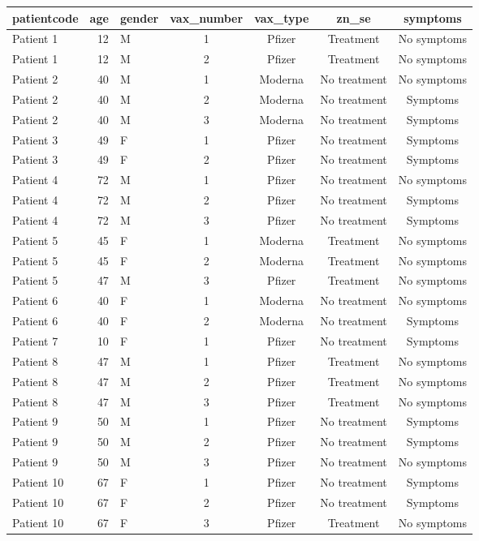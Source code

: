 \documentclass[
]{article}
\begin{document}
\captionsetup[table]{labelformat=empty,skip=1pt}
\begin{longtable}{lrlcccc}
\toprule
patientcode & age & gender & vax\_number & vax\_type & zn\_se & symptoms \\ 
\midrule
Patient 1 & 12 & M & 1 & Pfizer & Treatment & No symptoms \\ 
Patient 1 & 12 & M & 2 & Pfizer & Treatment & No symptoms \\ 
Patient 2 & 40 & M & 1 & Moderna & No treatment & No symptoms \\ 
Patient 2 & 40 & M & 2 & Moderna & No treatment & Symptoms \\ 
Patient 2 & 40 & M & 3 & Moderna & No treatment & Symptoms \\ 
Patient 3 & 49 & F & 1 & Pfizer & No treatment & Symptoms \\ 
Patient 3 & 49 & F & 2 & Pfizer & No treatment & Symptoms \\ 
Patient 4 & 72 & M & 1 & Pfizer & No treatment & No symptoms \\ 
Patient 4 & 72 & M & 2 & Pfizer & No treatment & Symptoms \\ 
Patient 4 & 72 & M & 3 & Pfizer & No treatment & Symptoms \\ 
Patient 5 & 45 & F & 1 & Moderna & Treatment & No symptoms \\ 
Patient 5 & 45 & F & 2 & Moderna & Treatment & No symptoms \\ 
Patient 5 & 47 & M & 3 & Pfizer & Treatment & No symptoms \\ 
Patient 6 & 40 & F & 1 & Moderna & No treatment & No symptoms \\ 
Patient 6 & 40 & F & 2 & Moderna & No treatment & Symptoms \\ 
Patient 7 & 10 & F & 1 & Pfizer & No treatment & Symptoms \\ 
Patient 8 & 47 & M & 1 & Pfizer & Treatment & No symptoms \\ 
Patient 8 & 47 & M & 2 & Pfizer & Treatment & No symptoms \\ 
Patient 8 & 47 & M & 3 & Pfizer & Treatment & No symptoms \\ 
Patient 9 & 50 & M & 1 & Pfizer & No treatment & Symptoms \\ 
Patient 9 & 50 & M & 2 & Pfizer & No treatment & Symptoms \\ 
Patient 9 & 50 & M & 3 & Pfizer & No treatment & No symptoms \\ 
Patient 10 & 67 & F & 1 & Pfizer & No treatment & Symptoms \\ 
Patient 10 & 67 & F & 2 & Pfizer & No treatment & Symptoms \\ 
Patient 10 & 67 & F & 3 & Pfizer & Treatment & No symptoms \\ 
 \bottomrule
\end{longtable}
\end{document}
